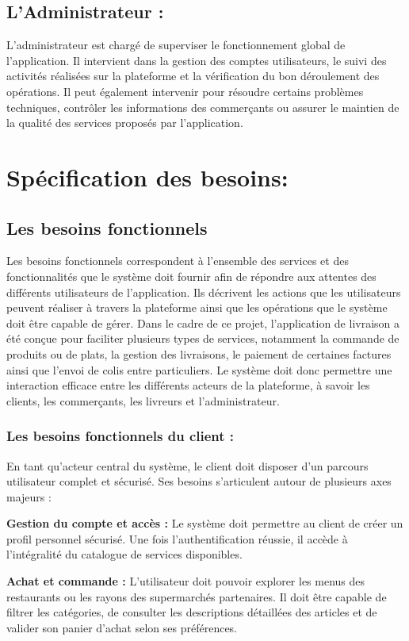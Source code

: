 \documentclass[12pt,fleqn,a4paper]{report}
\begin{document}
\begin{justify}
\subsection{L'Administrateur :}
L'administrateur est chargé de superviser le fonctionnement global de l'application. Il intervient dans la gestion des comptes utilisateurs, le suivi des activités réalisées sur la plateforme et la vérification du bon déroulement des opérations. Il peut également intervenir pour résoudre certains problèmes techniques, contrôler les informations des commerçants ou assurer le maintien de la qualité des services proposés par l'application.
\newpage
\section{Spécification des besoins:}
\subsection{Les besoins fonctionnels}
Les besoins fonctionnels correspondent à l'ensemble des services et des fonctionnalités que le système doit fournir afin de répondre aux attentes des différents utilisateurs de l'application. Ils décrivent les actions que les utilisateurs peuvent réaliser à travers la plateforme ainsi que les opérations que le système doit être capable de gérer. Dans le cadre de ce projet, l'application de livraison a été conçue pour faciliter plusieurs types de services, notamment la commande de produits ou de plats, la gestion des livraisons, le paiement de certaines factures ainsi que l'envoi de colis entre particuliers. Le système doit donc permettre une interaction efficace entre les différents acteurs de la plateforme, à savoir les clients, les commerçants, les livreurs et l'administrateur.

\subsubsection{Les besoins fonctionnels du client :}
En tant qu'acteur central du système, le client doit disposer d'un parcours utilisateur complet et sécurisé. Ses besoins s'articulent autour de plusieurs axes majeurs :


\textbf{Gestion du compte et accès :} Le système doit permettre au client de créer un profil personnel sécurisé. Une fois l'authentification réussie, il accède à l'intégralité du catalogue de services disponibles.

\vspace{0.4cm}
\textbf{Achat et commande :} L'utilisateur doit pouvoir explorer les menus des restaurants ou les rayons des supermarchés partenaires. Il doit être capable de filtrer les catégories, de consulter les descriptions détaillées des articles et de valider son panier d'achat selon ses préférences.


\end{justify}
\end{document}

